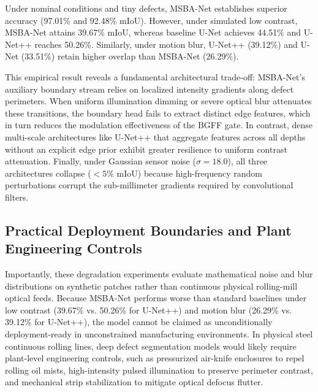 \documentclass{ieeeaccess}
\begin{document}
Under nominal conditions and tiny defects, MSBA-Net establishes superior accuracy (97.01\% and 92.48\% mIoU). However, under simulated low contrast, MSBA-Net attains 39.67\% mIoU, whereas baseline U-Net achieves 44.51\% and U-Net++ reaches 50.26\%. Similarly, under motion blur, U-Net++ (39.12\%) and U-Net (33.51\%) retain higher overlap than MSBA-Net (26.29\%).

This empirical result reveals a fundamental architectural trade-off: MSBA-Net's auxiliary boundary stream relies on localized intensity gradients along defect perimeters. When uniform illumination dimming or severe optical blur attenuates these transitions, the boundary head fails to extract distinct edge features, which in turn reduces the modulation effectiveness of the BGFF gate. In contrast, dense multi-scale architectures like U-Net++ that aggregate features across all depths without an explicit edge prior exhibit greater resilience to uniform contrast attenuation. Finally, under Gaussian sensor noise ($\sigma = 18.0$), all three architectures collapse ($<5\%$ mIoU) because high-frequency random perturbations corrupt the sub-millimeter gradients required by convolutional filters.

\subsection{Practical Deployment Boundaries and Plant Engineering Controls}
Importantly, these degradation experiments evaluate mathematical noise and blur distributions on synthetic patches rather than continuous physical rolling-mill optical feeds. Because MSBA-Net performs worse than standard baselines under low contrast (39.67\% vs. 50.26\% for U-Net++) and motion blur (26.29\% vs. 39.12\% for U-Net++), the model cannot be claimed as unconditionally deployment-ready in unconstrained manufacturing environments. In physical steel continuous rolling lines, deep defect segmentation models would likely require plant-level engineering controls, such as pressurized air-knife enclosures to repel rolling oil mists, high-intensity pulsed illumination to preserve perimeter contrast, and mechanical strip stabilization to mitigate optical defocus flutter.
\end{document}
